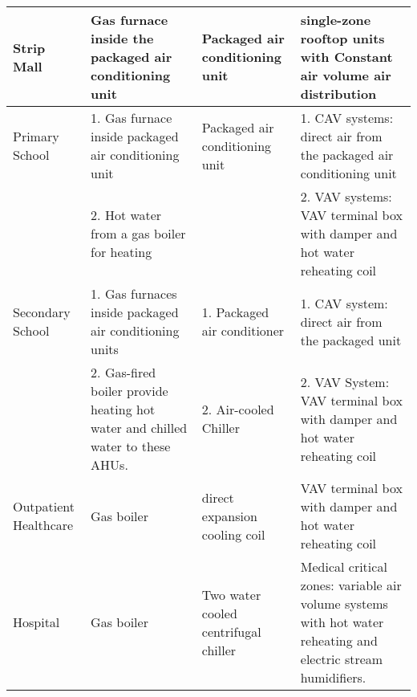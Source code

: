\begin{table}[h!]
\begin{longtable}{p{2cm}|p{2cm}|p{4cm}|p{4cm}}
  \hline
  Strip Mall                   & Gas furnace inside the packaged air conditioning unit                           & Packaged air conditioning unit                                               & single-zone rooftop units with Constant air volume air distribution                                                                                                    \\
  \hline
  Primary School               & 1. Gas furnace inside packaged air conditioning unit                            & Packaged air conditioning unit                                               & 1. CAV systems: direct air from the packaged air conditioning unit                                                                                                     \\
                               & 2. Hot water from a gas boiler for heating                                      &                                                                              & 2. VAV systems: VAV terminal box with damper and hot water reheating coil                                                                                              \\
  \hline
  Secondary School             & 1. Gas furnaces inside packaged air conditioning units                          & 1. Packaged air conditioner                                                  & 1. CAV system: direct air from the packaged unit                                                                                                                       \\
                               & 2. Gas-fired boiler  provide heating hot water and chilled water to these AHUs. & 2. Air-cooled Chiller                                                        & 2. VAV System: VAV terminal box with damper and hot water reheating coil                                                                                               \\
  \hline
  Outpatient Healthcare        & Gas boiler                                                                      & direct expansion cooling coil                                                              & VAV terminal box with damper and hot water reheating coil                                                                                                              \\
  \hline
  Hospital                     & Gas boiler                                                                      & Two water cooled centrifugal chiller                                         & Medical critical zones: variable air volume systems with hot water reheating and electric stream humidifiers.                                                          \\

\end{longtable}
\end{table}

